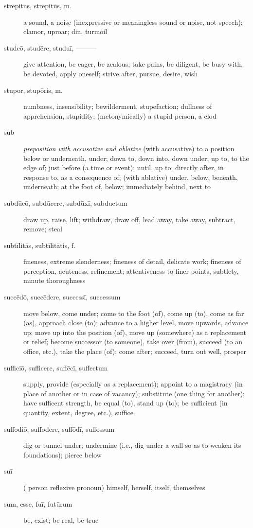 \begin{description}
    \item[strepitus, strepitūs, m.] a sound, a noise (inexpressive or meaningless sound or noise, not speech); clamor, uproar; din, turmoil
    \item[studeō, studēre, studuī, ———] give attention, be eager, be zealous; take pains, be  diligent, be busy with, be devoted, apply oneself; strive after, pursue, desire, wish
    \item[stupor, stupōris, m.] numbness, insensibility; bewilderment, stupefaction; dullness of apprehension, stupidity; (metonymically) a stupid person, a clod
    \item[sub] \textit{preposition with accusative and ablative} (with accusative) to a position below or underneath, under; down to, down into, down under; up to, to the edge of; just before (a time or event); until, up to; directly after, in response to, as a consequence of; (with ablative) under, below, beneath, underneath; at the foot of, below; immediately behind, next to
    \item[subdūcō, subdūcere, subdūxī, subductum] draw up, raise, lift; withdraw, draw off, lead away, take away, subtract, remove; steal
    \item[subtīlitās, subtīlitātis, f.] fineness, extreme slenderness; fineness of detail, delicate work; fineness of perception, acuteness, refinement; attentiveness to finer points, subtlety, minute thoroughness
    \item[succēdō, succēdere, successī, successum] move below, come under; come to the foot (of), come up (to), come as far (as), approach close (to); advance to a higher level, move upwards, advance up; move up into the position (of), move up (somewhere) as a replacement or relief; become successor (to someone), take over (from), succeed (to an office, etc.), take the place (of); come after; succeed, turn out well, prosper
    \item[sufficiō, sufficere, suffēcī, suffectum] supply, provide (especially as a replacement); appoint to a magistracy (in place of another or in case of vacancy); substitute (one thing for another); have sufficent strength, be equal (to), stand up (to); be sufficient (in quantity, extent, degree, etc.), suffice
    \item[suffodiō, suffodere, suffōdī, suffossum] dig or tunnel under; undermine (i.e., dig under a wall so as to weaken its foundations); pierce below
    \item[suī] ( person reflexive pronoun) himself, herself, itself, themselves
    \item[sum, esse, fuī, futūrum] be, exist; be real, be true

\end{description}
